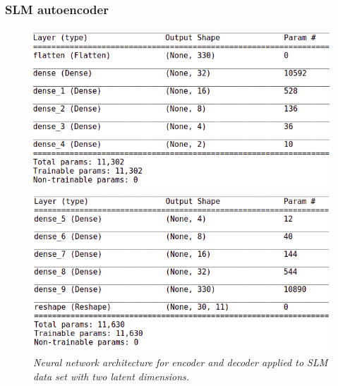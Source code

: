 \documentclass{beamer}
\begin{document}
\begin{frame}
\frametitle{SLM autoencoder}
\begin{figure}
	\begin{minipage}{0.45\linewidth}
		\includegraphics[scale=0.24]{ae_encoder_net.png}
	\end{minipage}
	\begin{minipage}{0.45\linewidth}
		\includegraphics[scale=0.24]{ae_decoder_net.png}
	\end{minipage}
	\caption{\it Neural network architecture for encoder and decoder applied to SLM data set with two latent dimensions.}
\end{figure}
\end{frame}
\end{document}
